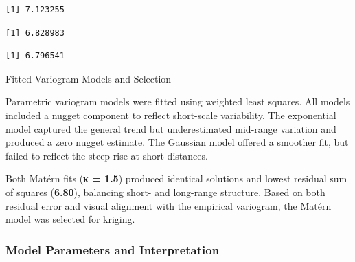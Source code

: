\documentclass[
  11pt,
]{article}
\begin{document}
\begin{verbatim}
[1] 7.123255
\end{verbatim}

\begin{verbatim}
[1] 6.828983
\end{verbatim}

\begin{verbatim}
[1] 6.796541
\end{verbatim}

Fitted Variogram Models and Selection

Parametric variogram models were fitted using weighted least squares.
All models included a nugget component to reflect short-scale
variability. The exponential model captured the general trend but
underestimated mid-range variation and produced a zero nugget estimate.
The Gaussian model offered a smoother fit, but failed to reflect the
steep rise at short distances.

Both Matérn fits (\textbf{κ = 1.5}) produced identical solutions and
lowest residual sum of squares (\textbf{6.80}), balancing short- and
long-range structure. Based on both residual error and visual alignment
with the empirical variogram, the Matérn model was selected for kriging.

\subsubsection{\texorpdfstring{\textbf{Model Parameters and
Interpretation}}{Model Parameters and Interpretation}}\label{model-parameters-and-interpretation}
\end{document}
